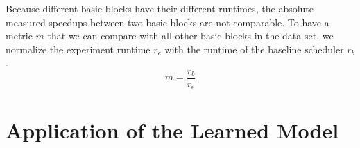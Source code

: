 Because different basic blocks have their different runtimes, the absolute measured speedups between two basic blocks are not comparable.
To have a metric $m$ that we can compare with all other basic blocks in the data set, we normalize the experiment runtime $r_e$ with the runtime of the baseline scheduler $r_b$.
\begin{equation}
    m=\frac{r_b}{r_e}
\end{equation}

\section{Application of the Learned Model}
\label{sec:approach:ml-scheduler}
